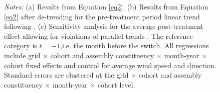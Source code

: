 \documentclass[12pt]{article}
\begin{document}
{\begin{figure}[htbp!]
    \par\bigskip
    \begin{minipage}{0.9\textwidth}
        \footnotesize \textit{Notes:} (a) Results from Equation \ref{eq2}. (b) Results from Equation \ref{eq2} after de-trending for the pre-treatment period linear trend following \citet{dustmann2022reallocation}. (c) Sensitivity analysis for the average post-treatment effect allowing for violations of parallel trends \citep{rambachan2023more}.
        The reference category is $t=-1$,i.e. the month before the switch.  All regressions include grid $\times$ cohort and assembly constituency $\times$ month-year $\times$ cohort fixed effects and control for average wind speed and direction. Standard errors are clustered at the grid $\times$ cohort and assembly constituency $\times$  month-year $\times$ cohort level.
    \end{minipage}
\end{figure}





}
\end{document}
